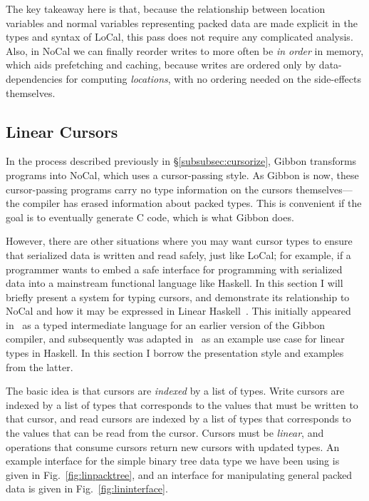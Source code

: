 \documentclass[showabstract,showacknowledgments,showpreface,showdedication,school]{iuphd}
\theoremstyle{nonumberplain}
\newcommand{\sysname}[0]{LoCal\xspace}
\newcommand{\ourcalc}[0]{\sysname}
\newcommand{\lamcur}[0]{NoCal\xspace}
\newcommand{\secref}[1]{\S\ref{#1}}
\newcommand{\Figref}[1]{Fig.~\ref{#1}}
\newcommand{\figref}[1]{Fig.~\ref{#1}}
\begin{document}
The key takeaway here is that, because the relationship between
location variables and normal variables representing packed data are
made explicit in the types and syntax of \ourcalc{}, this pass
does not require any complicated analysis.
Also, in \lamcur{} we can finally reorder writes to more often be {\em in order}
in memory, which aids prefetching and caching,
because writes are ordered only by
data-dependencies for computing \emph{locations}, with no ordering needed
on the side-effects themselves.

\subsection{Linear Cursors}\label{subsec:linear}

In the process described previously in \secref{subsubsec:cursorize}, Gibbon
transforms programs into \lamcur{}, which uses a cursor-passing style. As Gibbon
is now, these cursor-passing programs carry no type information on the cursors
themselves---the compiler has erased information about packed types. This is
convenient if the goal is to eventually generate C code, which is what Gibbon
does.

However, there are other situations where you may want cursor types to ensure
that serialized data is written and read safely, just like \ourcalc{}; for
example, if a programmer wants to embed a safe interface for programming with
serialized data into a mainstream functional language like Haskell. In this
section I will briefly present a system for typing cursors, and demonstrate its
relationship to \lamcur{} and how it may be expressed in Linear
Haskell~\cite{linear-haskell}. This initially appeared in~\cite{ecoop17-gibbon}
as a typed intermediate language for an earlier version of the Gibbon compiler,
and subsequently was adapted in~\cite{linear-haskell} as an example use case for
linear types in Haskell. In this section I borrow the presentation style
and examples from the latter.

The basic idea is that cursors are \emph{indexed} by a list of types.
Write cursors are indexed by a list of types that corresponds to the values
that must be written to that cursor, and read cursors are indexed by a list of
types that corresponds to the values that can be read from the cursor.
Cursors must be \emph{linear}, and operations that consume cursors return
new cursors with updated types. An example interface for the simple
binary tree data type we have been using is given in \Figref{fig:linpacktree},
and an interface for manipulating general packed data is given in
\figref{fig:lininterface}.
\end{document}
